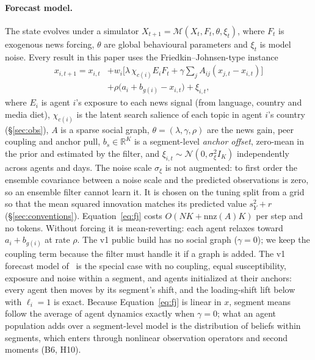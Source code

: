 \documentclass[10pt]{article}
\theoremstyle{remark}
\newcommand{\R}{\mathbb{R}}
\begin{document}
\paragraph{Forecast model.} The state evolves under a simulator $X_{t+1} = \mathcal{M}(X_t, F_t, \theta, \xi_t)$, where $F_t$ is exogenous news forcing, $\theta$ are global behavioural parameters and $\xi_t$ is model noise. Every result in this paper uses the Friedkin--Johnsen-type instance
\begin{equation}
\begin{split}
x_{i,t+1} = x_{i,t} &+ w_i\Big[\lambda\, \chi_{c(i)}E_i F_t + \gamma \sum\nolimits_j A_{ij}(x_{j,t}-x_{i,t})\Big]\\
&+ \rho\big(a_i + b_{g(i)} - x_{i,t}\big) + \xi_{i,t},
\end{split}
\label{eq:fj}
\end{equation}
where $E_i$ is agent $i$'s exposure to each news signal (from language, country and media diet), $\chi_{c(i)}$ is the latent search salience of each topic in agent $i$'s country (\S\ref{sec:obs}), $A$ is a sparse social graph, $\theta=(\lambda,\gamma,\rho)$ are the news gain, peer coupling and anchor pull, $b_s\in\R^K$ is a segment-level \emph{anchor offset}, zero-mean in the prior and estimated by the filter, and $\xi_{i,t}\sim\mathcal{N}(0,\sigma_\xi^2 I_K)$ independently across agents and days. The noise scale $\sigma_\xi$ is not augmented: to first order the ensemble covariance between a noise scale and the predicted observations is zero, so an ensemble filter cannot learn it. It is chosen on the tuning split from a grid so that the mean squared innovation matches its predicted value $s_Y^2+r$ (\S\ref{sec:conventions}). Equation~\eqref{eq:fj} costs $O(NK+\mathrm{nnz}(A)K)$ per step and no tokens. Without forcing it is mean-reverting: each agent relaxes toward $a_i+b_{g(i)}$ at rate $\rho$. The v1 public build has no social graph ($\gamma=0$); we keep the coupling term because the filter must handle it if a graph is added. The v1 forecast model of~\cite{rw_askaworld} is the special case with no coupling, equal susceptibility, exposure and noise within a segment, and agents initialized at their anchors: every agent then moves by its segment's shift, and the loading-shift lift below with $\ell_i=1$ is exact. Because Equation~\eqref{eq:fj} is linear in $x$, segment means follow the average of agent dynamics exactly when $\gamma=0$; what an agent population adds over a segment-level model is the distribution of beliefs within segments, which enters through nonlinear observation operators and second moments (B6, H10).
\end{document}
